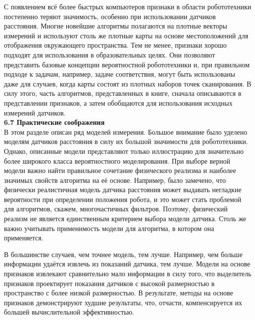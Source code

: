 \documentclass[10pt,a4paper]{article}
\begin{document}
С появлением всё более быстрых компьютеров признаки в области робототехники постепенно теряют значимость, особенно при использовании датчиков расстояния. Многие новейшие алгоритмы полагаются на плотные векторы измерений и используют столь же плотные карты на основе местоположений для отображения окружающего пространства. Тем не менее, признаки хорошо подходят для использования в образовательных целях. Они позволяют представить базовые концепции вероятностной робототехники и, при правильном подходе к задачам, например, задаче соответствия, могут быть использованы даже для случаев, когда карты состоят из плотных наборов точек сканирования. В силу этого, часть алгоритмов, представленных в книге, сначала описываются в представлении признаков, а затем обобщаются для использования исходных измерений датчиков.\\

\textbf{6.7 Практические соображения}\\

В этом разделе описан ряд моделей измерения. Большое внимание было уделено моделям датчиков расстояния в силу их большой значимости для робототехники. Однако, описанные модели представляют только иллюстрацию для значительно более широкого класса вероятностного моделирования. При выборе верной модели важно найти правильное сочетание физического реализма и наиболее значимых свойств алгоритма на её основе. Например, было замечено, что физически реалистичная модель датчика расстояния может выдавать негладкие вероятности при определении положения робота, и это может стать проблемой для алгоритмов, скажем, многочастичных фильтров. Поэтому, физический реализм не является единственным критерием выбора модели датчика. Столь же важно учитывать применимость модели для алгоритма, в котором она применяется. 

В большинстве случаев, чем точнее модель, тем лучше. Например, чем больше информации удаётся извлечь из показаний датчика, тем лучше. Модели на основе признаков извлекают сравнительно мало информации в силу того, что выделитель признаков проектирует показания датчиков с высокой размерностью в пространство с более низкой размерностью. В результате, методы на основе признаков демонстрируют худшие результаты, что, отчасти, компенсируется их большей вычислительной эффективностью. 
\end{document}
